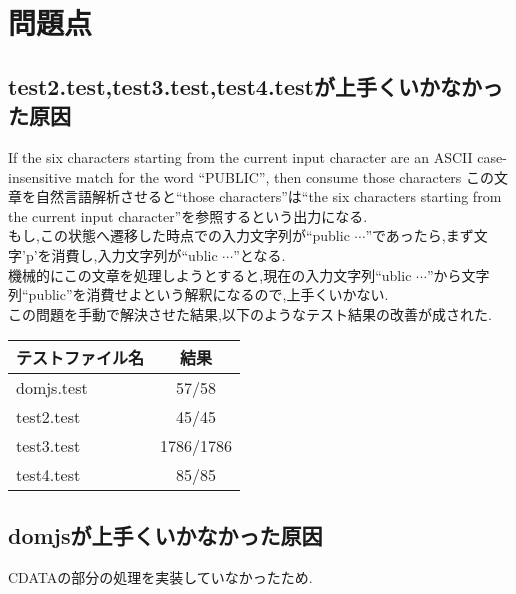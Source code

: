 \documentclass[uplatex,a4j]{jsreport}
\begin{document}
\section{問題点}
\subsection*{test2.test,test3.test,test4.testが上手くいかなかった原因}%
If the six characters starting from the current input character are an ASCII case-insensitive match for the word ``PUBLIC'', then consume those characters
この文章を自然言語解析させると``those characters''は``the six characters starting from the current input character''を参照するという出力になる.\\
もし,この状態へ遷移した時点での入力文字列が``public $\cdots$''であったら,まず文字'p'を消費し,入力文字列が``ublic $\cdots$''となる.\\
機械的にこの文章を処理しようとすると,現在の入力文字列``ublic $\cdots$''から文字列``public''を消費せよという解釈になるので,上手くいかない.\\
この問題を手動で解決させた結果,以下のようなテスト結果の改善が成された.\\
\begin{table}[htb]
    \begin{tabular}{|l|c|} \hline
      テストファイル名 & 結果 \\ \hline 
      domjs.test & 57/58 \\
      test2.test & 45/45 \\
      test3.test & 1786/1786 \\
      test4.test & 85/85 \\ \hline 
    \end{tabular}
\end{table}

\subsection*{domjsが上手くいかなかった原因}
CDATAの部分の処理を実装していなかったため.
\end{document}
